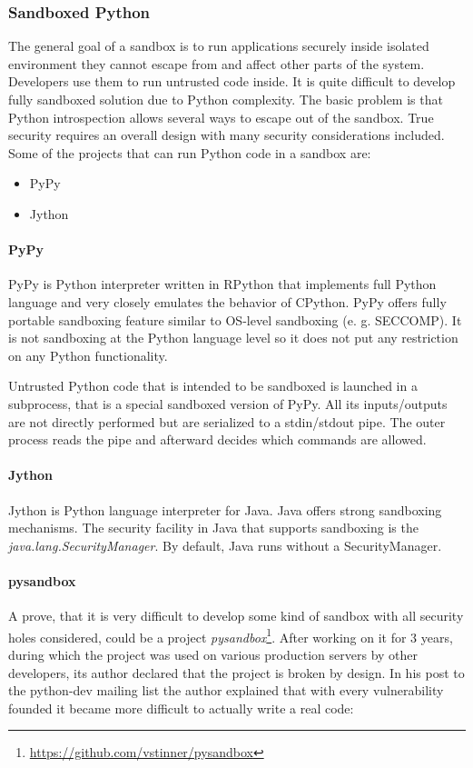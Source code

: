 \documentclass[12pt,a4paper]{article}
\begin{document}
\subsubsection{Sandboxed Python}
The general goal of a sandbox is to run applications securely inside isolated environment they cannot escape from and
affect other parts of the system. Developers use them to run untrusted code inside. It is quite difficult to develop
fully sandboxed solution due to Python complexity. The basic problem is that Python introspection allows several ways
to escape out of the sandbox. True security requires an overall design with many security considerations included. Some
of the projects that can run Python code in a sandbox are:
\begin{itemize}
\item PyPy
\item Jython
\end{itemize}

\paragraph{PyPy} PyPy is Python interpreter written in RPython that implements full Python language and very closely 
emulates the behavior of CPython. PyPy offers fully portable sandboxing feature similar to OS-level sandboxing (e. g. SECCOMP).
It is not sandboxing at the Python language level so it does not put any restriction on any Python functionality.

Untrusted Python code that is intended to be sandboxed is launched in a subprocess, that is a special sandboxed version of PyPy.
All its inputs/outputs are not directly performed but are serialized to a stdin/stdout pipe. The outer process reads the pipe 
and afterward decides which commands are allowed.

\paragraph{Jython} Jython is Python language interpreter for Java. Java offers strong sandboxing mechanisms. The security 
facility in Java that supports sandboxing is the \textit{java.lang.SecurityManager}. By default, Java runs without a 
SecurityManager.

\paragraph{pysandbox} A prove, that it is very difficult to develop some kind of sandbox with all security holes considered, could be a project  \textit{pysandbox}\footnote{\url{https://github.com/vstinner/pysandbox}}. After working on it for 3 years, during which
the project was used on various production servers by other developers, its author declared that the project is broken by
design. In his post to the python-dev mailing list \cite{PyDev_ML} the author explained that with every vulnerability founded
it became more difficult to actually write a real code:
\end{document}
